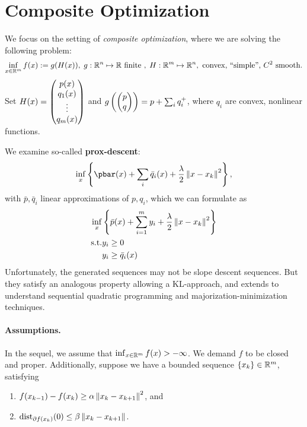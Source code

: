 \section{Composite Optimization}
We focus on the setting of \textit{composite optimization}, where we are
solving the following problem:
\begin{align}
    \inf_{x \in \mathbb{R}^m} f(x) := g(H(x)), \; g: \mathbb{R}^n \mapsto \mathbb{R} \text{
    finite }, \; H: \mathbb{R}^m \mapsto \mathbb{R}^n, \text{ convex, ``simple'', $C^2$
    smooth}.
    \label{eq:comp-prob}
\end{align}
Set $H(x) = \begin{pmatrix} p(x) \\ q_1(x) \\ \vdots \\ q_m(x) \end{pmatrix}$ and $g\left(\begin{pmatrix} p \\
q \end{pmatrix}\right) = p + \sum_i q_i^+$, where $q_i$ are convex, nonlinear functions.

We examine so-called \textbf{prox-descent}:
\begin{align*}
    \inf_x \set{\pbar(x) + \sum_i \bar{q}_i(x) + \frac{\lambda}{2} \norm{x -
    x_k}^2},
\end{align*}
with $\bar{p}, \bar{q}_i$ linear approximations of $p, q_i$, which we can
formulate as
\begin{align}
    \begin{aligned}
        \inf_x & \left\{ \bar{p}(x) + \sum_{i=1}^m y_i + \frac{\lambda}{2} \left \| x
        -
        x_k \right \|^2 \right\} \\
        \mbox{s.t.} & y_i \geq 0 \\
                    & y_i \geq \bar{q}_i(x)
    \end{aligned}
    \label{eq:lcqp}
\end{align}
Unfortunately, the generated sequences may not be slope descent sequences. But
they satisfy an analogous property allowing a KL-approach, and extends to
understand sequential quadratic programming and majorization-minimization
techniques.

\paragraph{Assumptions.} In the sequel, we assume that $\inf_{x \in \mathbb{R}^m}
f(x) > -\infty$. We demand $f$ to be closed and proper. Additionally, suppose
we have a bounded sequence $\left\{ x_k \right\} \in \mathbb{R}^m$, satisfying
\begin{enumerate}
\item $f(x_{k-1}) - f(x_k) \geq \alpha \left \| x_k - x_{k+1} \right \|^2$, and
\item $\mathrm{dist}_{\partial f(x_k)}(0) \leq \beta \left \| x_k - x_{k+1} \right \|$.
\end{enumerate}

